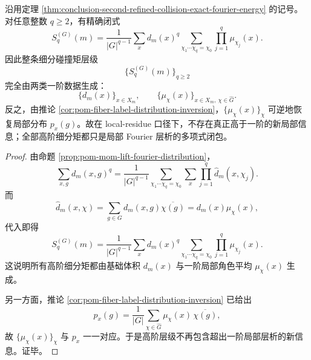 \begin{theorem}[一阶局部层析生成全部高阶细分矩]\label{thm:conclusion-first-order-local-tomography-generates-all-refined-moments}
沿用定理 \ref{thm:conclusion-second-refined-collision-exact-fourier-energy} 的记号。对任意整数 \(q\ge2\)，有精确闭式
\[
S_q^{(G)}(m)
=
\frac1{|G|^{q-1}}
\sum_{x}d_m(x)^q
\sum_{\chi_1\cdots\chi_q=\chi_0}
\prod_{j=1}^{q}\mu_{\chi_j}(x).
\]
因此整条细分碰撞矩层级
\[
\{S_q^{(G)}(m)\}_{q\ge2}
\]
完全由两类一阶数据生成：
\[
\{d_m(x)\}_{x\in X_m},
\qquad
\{\mu_\chi(x)\}_{x\in X_m,\ \chi\in\widehat G}.
\]
反之，由推论 \ref{cor:pom-fiber-label-distribution-inversion}，\(\{\mu_\chi(x)\}_{\chi}\) 可逆地恢复局部分布 \(p_x(g)\)。故在 local-residue 口径下，不存在真正高于一阶的新局部信息；全部高阶细分矩都只是局部 Fourier 层析的多项式闭包。
\end{theorem}
\begin{proof}
由命题 \ref{prop:pom-mom-lift-fourier-distribution}，
\[
\sum_{x,g}d_m(x,g)^q
=
\frac{1}{|G|^{q-1}}
\sum_{\chi_1\cdots\chi_q=\chi_0}
\sum_x \prod_{j=1}^{q}\widehat d_m(x,\chi_j).
\]
而
\[
\widehat d_m(x,\chi)=\sum_{g\in G}d_m(x,g)\overline{\chi(g)}
=
d_m(x)\mu_\chi(x),
\]
代入即得
\[
S_q^{(G)}(m)
=
\frac1{|G|^{q-1}}
\sum_x d_m(x)^q
\sum_{\chi_1\cdots\chi_q=\chi_0}
\prod_{j=1}^{q}\mu_{\chi_j}(x).
\]
这说明所有高阶细分矩都由基础体积 \(d_m(x)\) 与一阶局部角色平均 \(\mu_\chi(x)\) 生成。

另一方面，推论 \ref{cor:pom-fiber-label-distribution-inversion} 已给出
\[
p_x(g)=\frac1{|G|}\sum_{\chi\in\widehat G}\mu_\chi(x)\,\overline{\chi(g)},
\]
故 \(\{\mu_\chi(x)\}_\chi\) 与 \(p_x\) 一一对应。于是高阶层级不再包含超出一阶局部层析的新信息。证毕。
\end{proof}



\endinput
